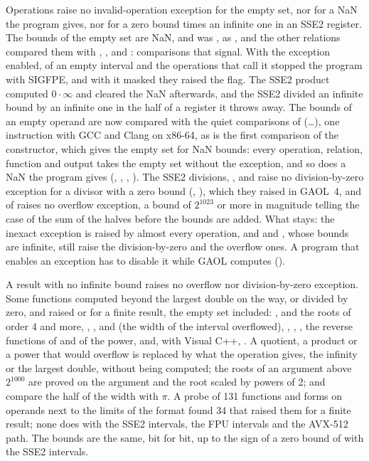 \documentclass[12pt,a4paper,twoside,openright]{book}
\begin{document}
Operations raise no invalid-operation exception for the empty set, nor for a
NaN the program gives, nor for a zero bound times an infinite one in an SSE2
register.\newinvfive{} The bounds of the empty set are NaN, and
 was , as ,
 and the other relations compared them with \code{<},
\code{<=}, \code{>} and \code{>=}: comparisons that signal. With the
exception enabled,  of an empty interval and the operations
that call it stopped the program with SIGFPE, and with it masked they raised
the flag. The SSE2 product computed $0 \cdot \infty$ and cleared the NaN
afterwards, and the SSE2  divided an infinite bound by an
infinite one in the half of a register it throws away. The bounds of an empty
operand are now compared with the quiet comparisons of 
(\ldots), one instruction with GCC and Clang on
x86-64, as is the first comparison of the constructor, which gives the empty
set for NaN bounds: every operation, relation, function and output takes the
empty set without the exception, and so does a NaN the program gives
(, , , ).
The SSE2 divisions, \code{\%},  and  raise
no division-by-zero exception for a divisor with a zero bound
(, ), which they raised in GAOL~4, and
 of  raises no overflow exception, a bound
of $2^{1023}$ or more in magnitude telling the case of the sum of the halves
before the bounds are added. What stays: the inexact exception is raised by
almost every operation, and  and , whose
bounds are infinite, still raise the division-by-zero and the overflow ones.
A program that enables an exception has to disable it while GAOL computes
().

\medskip
A result with no infinite bound raises no overflow nor division-by-zero
exception.\newinvfive{} Some functions computed beyond the largest double on
the way, or divided by zero, and raised  or
 for a finite result, the empty set included:
,  and the roots of
order 4 and more, , ,
 and  (the width of the interval
overflowed), , , ,
the reverse functions of  and of the power, 
and, with Visual C++, . A quotient, a product or a
power that would overflow is replaced by what the operation gives, the
infinity or the largest double, without being computed; the roots of an
argument above $2^{1000}$ are proved on the argument and the root scaled by
powers of 2;  and  compare the half of the width
with $\pi$. A probe of 131 functions and forms on operands next to the limits
of the format found 34 that raised them for a finite result; none does with
the SSE2 intervals, the FPU intervals and the AVX-512 path. The bounds are the
same, bit for bit, up to the sign of a zero bound of  with
the SSE2 intervals.
\end{document}

